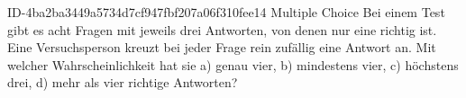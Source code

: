 \begin{exercise}
      {ID-4ba2ba3449a5734d7cf947fbf207a06f310fee14}
      {Multiple Choice}
  \ifproblem\problem
    Bei einem Test gibt es acht Fragen mit jeweils drei Antworten, von denen nur
    eine richtig ist. Eine Versuchsperson kreuzt bei jeder Frage rein zufällig
    eine Antwort an. Mit welcher Wahrscheinlichkeit hat sie
    a) genau vier,
    b) mindestens vier,
    c) höchstens drei,
    d) mehr als vier
    richtige Antworten?
  \fi
\end{exercise}

